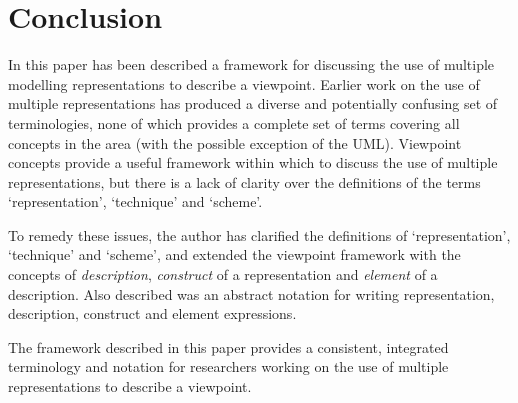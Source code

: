 \documentclass[10pt]{llncs}
\begin{document}

\section{Conclusion}
\label{Sec:Conclusion}

In this paper has been described a framework for discussing the use of multiple modelling representations to describe a viewpoint. Earlier work on the use of multiple representations has produced a diverse and potentially confusing set of terminologies, none of which provides a complete set of terms covering all concepts in the area (with the possible exception of the UML). Viewpoint concepts provide a useful framework within which to discuss the use of multiple representations, but there is a lack of clarity over the definitions of the terms `representation', `technique' and `scheme'.

To remedy these issues, the author has clarified the definitions of `representation', `technique' and `scheme', and extended the viewpoint framework with the concepts of \emph{description}, \emph{construct} of a representation and \emph{element} of a description. Also described was an abstract notation for writing representation, description, construct and element expressions.

The framework described in this paper provides a consistent, integrated terminology and notation for researchers working on the use of multiple representations to describe a viewpoint. 




\end{document}
